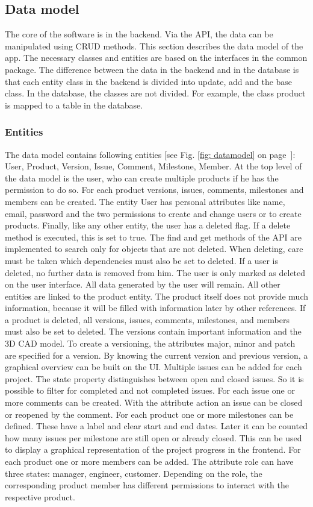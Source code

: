     \subsection*{Data model}
    The core of the software is in the backend. Via the API, the data can be manipulated using CRUD methods. This section describes the data model of the app. The necessary classes and entities are based on the interfaces in the common package. The difference between the data in the backend and in the database is that each entity class in the backend is divided into update, add and the base class. In the database, the classes are not divided. For example, the class product is mapped to a table in the database.
    
    \subsubsection*{Entities} %
    The data model contains following entities [see Fig. \ref{fig: datamodel} on page~\pageref{fig: datamodel}]: User, Product, Version, Issue, Comment, Milestone, Member. At the top level of the data model is the user, who can create multiple products if he has the permission to do so. For each product versions, issues, comments, milestones and members can be created. The entity User has personal attributes like name, email, password and the two permissions to create and change users or to create products. Finally, like any other entity, the user has a deleted flag. If a delete method is executed, this is set to true. The find and get methods of the API are implemented to search only for objects that are not deleted. When deleting, care must be taken which dependencies must also be set to deleted. If a user is deleted, no further data is removed from him. The user is only marked as deleted on the user interface. All data generated by the user will remain. All other entities are linked to the product entity. The product itself does not provide much information, because it will be filled with information later by other references. If a product is deleted, all versions, issues, comments, milestones, and members must also be set to deleted. The versions contain important information and the 3D CAD model. To create a versioning, the attributes major, minor and patch are specified for a version. By knowing the current version and previous version, a graphical overview can be built on the UI. Multiple issues can be added for each project. The state property distinguishes between open and closed issues. So it is possible to filter for completed and not completed issues. For each issue one or more comments can be created. With the attribute action an issue can be closed or reopened by the comment. For each product one or more milestones can be defined. These have a label and clear start and end dates. Later it can be counted how many issues per milestone are still open or already closed. This can be used to display a graphical representation of the project progress in the frontend. For each product one or more members can be added. The attribute role can have three states: manager, engineer, customer. Depending on the role, the corresponding product member has different permissions to interact with the respective product.

